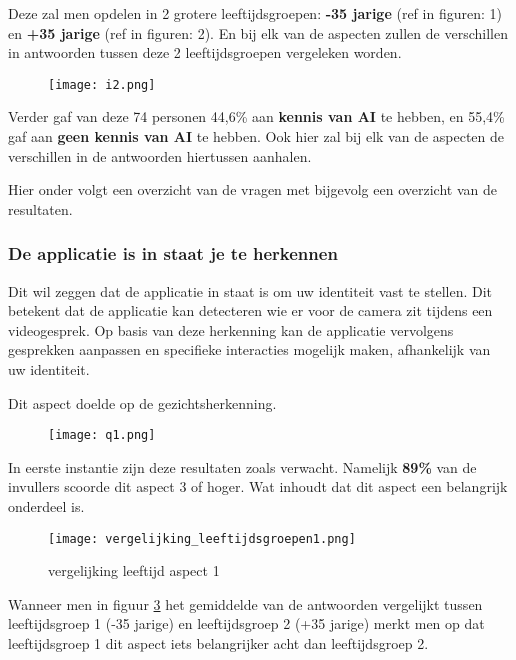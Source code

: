 Deze zal men opdelen in 2 grotere leeftijdsgroepen: \textbf{-35 jarige} (ref in figuren: 1) en \textbf{+35 jarige} (ref in figuren: 2). En bij elk van de aspecten zullen de verschillen in antwoorden tussen deze 2 leeftijdsgroepen vergeleken worden.

\begin{figure}[htbp]
    \centering
    \texttt{[image: i2.png]}
    \label{fig:ai_kennis_resultaat}
\end{figure}

Verder gaf van deze 74 personen 44,6\% aan \textbf{kennis van AI} te hebben, en 55,4\% gaf aan \textbf{geen kennis van AI} te hebben. Ook hier zal bij elk van de aspecten de verschillen in de antwoorden hiertussen aanhalen.

Hier onder volgt een overzicht van de vragen met bijgevolg een overzicht van de resultaten.

\newpage

\subsubsection{De applicatie is in staat je te herkennen}

Dit wil zeggen dat de applicatie in staat is om uw identiteit vast te stellen. Dit betekent dat de applicatie kan detecteren wie er voor de camera zit tijdens een videogesprek. Op basis van deze herkenning kan de applicatie vervolgens gesprekken aanpassen en specifieke interacties mogelijk maken, afhankelijk van uw identiteit.

Dit aspect doelde op de gezichtsherkenning.

\begin{figure}[htbp]
    \centering
    \texttt{[image: q1.png]}
    \label{fig:vraag_1_resultaat}
\end{figure}

In eerste instantie zijn deze resultaten zoals verwacht. Namelijk \textbf{89\%} van de invullers scoorde dit aspect 3 of hoger. Wat inhoudt dat dit aspect een belangrijk onderdeel is.

\begin{figure}[htbp]
    \centering
    \texttt{[image: vergelijking\_leeftijdsgroepen1.png]}
    \caption{vergelijking leeftijd aspect 1}
    \label{fig:vergelijking_leeftijd1}
\end{figure}

Wanneer men in figuur \ref{fig:vergelijking_leeftijd1} het gemiddelde van de antwoorden vergelijkt tussen leeftijdsgroep 1 (-35 jarige) en leeftijdsgroep 2 (+35 jarige) merkt men op dat leeftijdsgroep 1 dit aspect iets belangrijker acht dan leeftijdsgroep 2.


